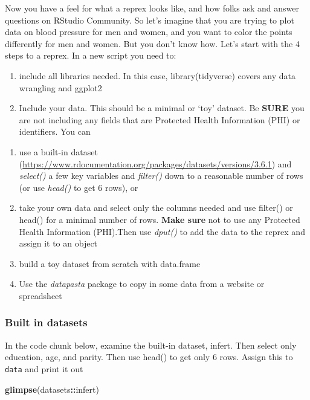 \documentclass[
]{book}
\newenvironment{Shaded}{\begin{snugshade}}{\end{snugshade}}
\newcommand{\KeywordTok}[1]{\textcolor[rgb]{0.13,0.29,0.53}{\textbf{#1}}}
\newcommand{\NormalTok}[1]{#1}
\newcommand{\OperatorTok}[1]{\textcolor[rgb]{0.81,0.36,0.00}{\textbf{#1}}}
\providecommand{\tightlist}{%
  \setlength{\itemsep}{0pt}\setlength{\parskip}{0pt}}
\begin{document}
Now you have a feel for what a reprex looks like, and how folks ask and answer questions on RStudio Community.
So let's imagine that you are trying to plot data on blood pressure for men and women, and you want to color the points differently for men and women. But you don't know how.
Let's start with the 4 steps to a reprex.
In a new script you need to:

\begin{enumerate}
\def\labelenumi{\arabic{enumi}.}
\tightlist
\item
  include all libraries needed.
  In this case,
  library(tidyverse)
  covers any data wrangling and ggplot2
\item
  Include your data. This should be a minimal or `toy' dataset. Be \textbf{SURE} you are not including any fields that are Protected Health Information (PHI) or identifiers. You can
\end{enumerate}

\begin{enumerate}
\def\labelenumi{\alph{enumi}.}
\tightlist
\item
  use a built-in dataset (\url{https://www.rdocumentation.org/packages/datasets/versions/3.6.1}) and \emph{select()} a few key variables and \emph{filter()} down to a reasonable number of rows (or use \emph{head()} to get 6 rows), or
\item
  take your own data and select only the columns needed and use filter() or head() for a minimal number of rows. \textbf{Make sure} not to use any Protected Health Information (PHI).Then use \emph{dput()} to add the data to the reprex and assign it to an object
\item
  build a toy dataset from scratch with data.frame
\item
  Use the \emph{datapasta} package to copy in some data from a website or spreadsheet
\end{enumerate}

\hypertarget{built-in-datasets}{%
\subsubsection{Built in datasets}\label{built-in-datasets}}

In the code chunk below, examine the built-in dataset, infert.
Then select only education, age, and parity.
Then use head() to get only 6 rows.
Assign this to \texttt{data} and print it out

\begin{Shaded}
\begin{Highlighting}[]
\KeywordTok{glimpse}\NormalTok{(datasets}\OperatorTok{::}\NormalTok{infert)}
\end{Highlighting}
\end{Shaded}
\end{document}
